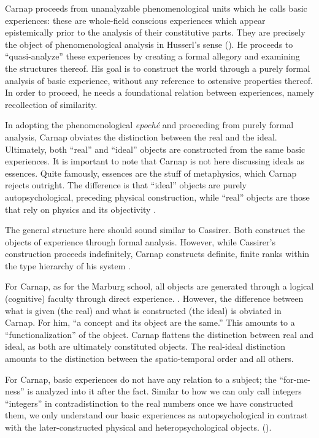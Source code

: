 \documentclass[leqno, 12pt]{turabian-researchpaper}
\begin{document}
	Carnap proceeds from unanalyzable phenomenological units which he calls basic experiences:
	these are whole-field conscious experiences which appear epistemically prior
	to the analysis of their constitutive parts. They are precisely the object of phenomenological
	analysis in Husserl's sense (). He proceeds to \enquote{quasi-analyze}
	these experiences by creating a formal allegory and examining the structures
	thereof. His goal is to construct the world through a purely formal analysis of
	basic experience, without any reference to ostensive properties thereof. In order
	to proceed, he needs a foundational relation between experiences, namely recollection
	of similarity.

	In adopting the phenomenological \textit{epoch\'e} and proceeding from purely
	formal analysis, Carnap obviates the distinction between the real and the ideal.
	Ultimately, both \enquote{real} and \enquote{ideal} objects are constructed from
	the same basic experiences. It is important to note that Carnap is not here
	discussing ideals as essences. Quite famously, essences are the stuff of
	metaphysics, which Carnap rejects outright. The difference is that \enquote{ideal}
	objects are purely autopsychological, preceding physical construction, while \enquote{real}
	objects are those that rely on physics and its objectivity \autocite[p77]{friedman2000}.

	The general structure here should sound similar to Cassirer. Both construct the
	objects of experience through formal analysis. However, while Cassirer's construction
	proceeds indefinitely, Carnap constructs definite, finite ranks within the type
	hierarchy of his system \autocite[p80]{friedman2000}.

	For Carnap, as for the Marburg school, all objects are generated through a logical
	(cognitive) faculty through direct experience. \autocite[p75]{friedman2000}. However,
	the difference between what is given (the real) and what is constructed (the ideal)
	is obviated in Carnap. For him, \enquote{a concept and its object are the same.}
	This amounts to a \enquote{functionalization} of the object. Carnap flattens the
	distinction between real and ideal, as both are ultimately constituted objects.
	The real-ideal distinction amounts to the distinction between the spatio-temporal
	order and all others. \autocite[p78]{friedman2000}

	For Carnap, basic experiences do not have any relation to a subject; the \enquote{for-me-ness}
	is analyzed into it after the fact. Similar to how we can only call integers \enquote{integers}
	in contradistinction to the real numbers once we have constructed them, we only
	understand our basic experiences as autopsychological in contrast with the later-constructed
	physical and heteropsychological objects. ().
\end{document}
